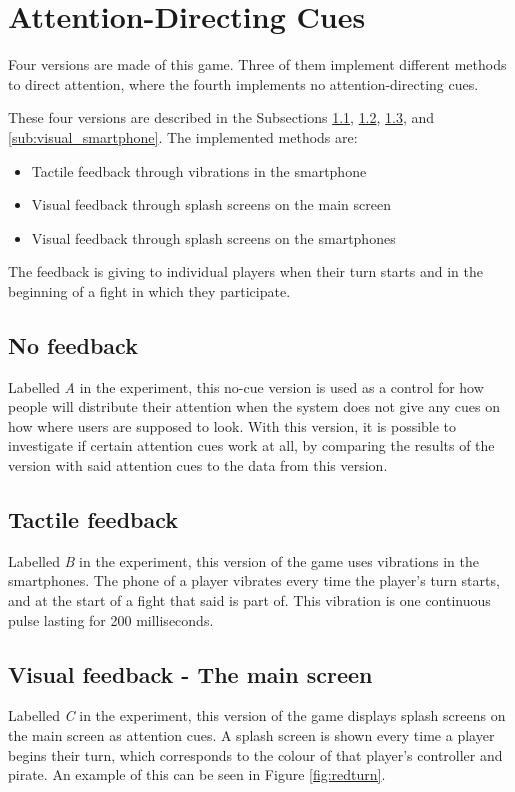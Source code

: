 \section{Attention-Directing Cues}
Four versions are made of this game. Three of them implement different methods to direct attention, where the fourth implements no attention-directing cues. 

These four versions are described in the Subsections \ref{sub:no_feedback}, \ref{sub:tactile_feedback}, \ref{sub:visual_main}, and \ref{sub:visual_smartphone}. The implemented methods are:

\begin{itemize}
\item Tactile feedback through vibrations in the smartphone
\item Visual feedback through splash screens on the main screen
\item Visual feedback through splash screens on the smartphones
\end{itemize}

The feedback is giving to individual players when their turn starts and in the beginning of a fight in which they participate.

\subsection{No feedback}\label{sub:no_feedback}
Labelled \textit{A} in the experiment, this no-cue version is used as a control for how people will distribute their attention when the system does not give any cues on how where users are supposed to look. With this version, it is possible to investigate if certain attention cues work at all, by comparing the results of the version with said attention cues to the data from this version.

\subsection{Tactile feedback}\label{sub:tactile_feedback}
Labelled \textit{B} in the experiment, this version of the game uses vibrations in the smartphones. The phone of a player vibrates every time the player's turn starts, and at the start of a fight that said is part of. This vibration is one continuous pulse lasting for 200 milliseconds.

\subsection{Visual feedback - The main screen}\label{sub:visual_main}
Labelled \textit{C} in the experiment, this version of the game displays splash screens on the main screen as attention cues. A splash screen is shown every time a player begins their turn, which corresponds to the colour of that player's controller and pirate. An example of this can be seen in Figure \ref{fig:redturn}.

